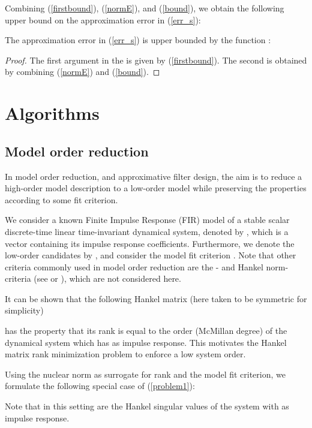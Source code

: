 \documentclass{article}
\begin{document}
Combining (\ref{firstbound}), (\ref{normE}), and (\ref{bound}), we obtain the following upper bound on the approximation error in (\ref{err_s}):
\begin{theorem}
The approximation error in (\ref{err_s}) is upper bounded by the function :

\end{theorem}
\begin{proof}
The first argument in the  is given by (\ref{firstbound}). The second is obtained by combining (\ref{normE}) and (\ref{bound}).
\end{proof}




\section{Algorithms}

\subsection{Model order reduction}

In model order reduction, and approximative filter design, the aim is to reduce a high-order model description to a low-order model while preserving the properties according to some fit criterion.

We consider a known Finite Impulse Response (FIR) model of a stable scalar discrete-time linear time-invariant dynamical system, denoted by , which is a vector containing its impulse response coefficients. Furthermore, we denote the low-order candidates by , and consider the  model fit criterion . Note that other criteria commonly used in model order reduction are the - and Hankel norm-criteria (see \cite{Antoulas:2005} or \cite{Zhou-Doyle-Glover-96}), which are not considered here.

It can be shown \cite{Fazel-Hindi-Boyd-03} that the following Hankel matrix (here taken to be symmetric for simplicity)

has the property that its rank is equal to the order (McMillan degree) of the dynamical system which has  as impulse response. This motivates the Hankel matrix rank minimization problem to enforce a low system order.

Using the nuclear norm as surrogate for rank and the  model fit criterion, we formulate the following special case of (\ref{problem1}):

Note that in this setting  are the Hankel singular values of the system with  as impulse response.
\end{document}
